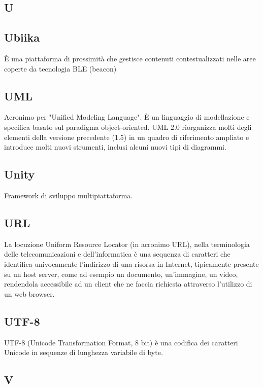 \newpage

\begin{center}
\Huge\section{\uppercase{U}}
\end{center}

\subsection{Ubiika}
È una piattaforma di prossimità che gestisce contenuti contestualizzati nelle
aree coperte da tecnologia BLE (beacon)​

\subsection{UML}
Acronimo per "Unified Modeling Language". È un linguaggio di modellazione e
specifica basato sul paradigma object-oriented. UML 2.0 riorganizza molti degli
elementi della versione precedente (1.5) in un quadro di riferimento ampliato e
introduce molti nuovi strumenti, inclusi alcuni nuovi tipi di diagrammi.

\subsection{Unity}
Framework di sviluppo multipiattaforma.

\subsection{URL}
La locuzione Uniform Resource Locator (in acronimo URL), nella terminologia delle telecomunicazioni e dell'informatica è una sequenza di caratteri che identifica univocamente l'indirizzo di una risorsa in Internet, tipicamente presente su un host server, come ad esempio un documento, un'immagine, un video, rendendola accessibile ad un client che ne faccia richiesta attraverso l'utilizzo di un web browser.

\subsection{UTF-8}
UTF-8 (Unicode Transformation Format, 8 bit) è una codifica dei caratteri Unicode in sequenze di lunghezza variabile di byte.

\newpage

\begin{center}
\Huge\section{\uppercase{V}}
\end{center}

